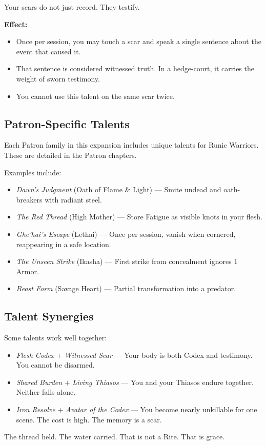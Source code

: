 Your scars do not just record. They testify.

\textbf{Effect:}
\begin{itemize}
\item Once per session, you may touch a scar and speak a single sentence about the event that caused it.
\item That sentence is considered witnessed truth. In a hedge-court, it carries the weight of sworn testimony.
\item You cannot use this talent on the same scar twice.
\end{itemize}

\subsection{Patron-Specific Talents}

Each Patron family in this expansion includes unique talents for Runic Warriors. These are detailed in the Patron chapters.

Examples include:

\begin{itemize}
\item \textit{Dawn's Judgment} (Oath of Flame \& Light) — Smite undead and oath-breakers with radiant steel.
\item \textit{The Red Thread} (High Mother) — Store Fatigue as visible knots in your flesh.
\item \textit{Ghe'hai's Escape} (Lethai) — Once per session, vanish when cornered, reappearing in a safe location.
\item \textit{The Unseen Strike} (Ikasha) — First strike from concealment ignores 1 Armor.
\item \textit{Beast Form} (Savage Heart) — Partial transformation into a predator.
\end{itemize}

\subsection{Talent Synergies}

Some talents work well together:

\begin{itemize}
\item \textit{Flesh Codex} + \textit{Witnessed Scar} — Your body is both Codex and testimony. You cannot be disarmed.
\item \textit{Shared Burden} + \textit{Living Thiasos} — You and your Thiasos endure together. Neither falls alone.
\item \textit{Iron Resolve} + \textit{Avatar of the Codex} — You become nearly unkillable for one scene. The cost is high. The memory is a scar.
\end{itemize}

The thread held. The water carried. That is not a Rite. That is grace.
